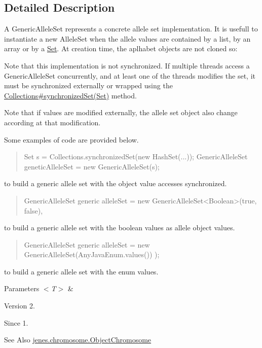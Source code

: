 \subsection{Detailed Description}
A Generic\-Allele\-Set represents a concrete allele set implementation. It is usefull to instantiate a new Allele\-Set when the allele values are contained by a list, by an array or by a \hyperlink{}{Set}. At creation time, the aplhabet objects are not cloned so\-: 

Note that this implementation is not synchronized. If multiple threads access a Generic\-Allele\-Set concurrently, and at least one of the threads modifies the set, it must be synchronized externally or wrapped using the \hyperlink{}{Collections\#synchronized\-Set(\-Set)} method. 

Note that if values are modified externally, the allele set object also change according at that modification. 

Some examples of code are provided below. 

\begin{quotation}

\begin{DoxyPre}
   Set s = Collections.synchronizedSet(new HashSet(...));
   GenericAlleleSet geneticAlleleSet = new GenericAlleleSet(s);
\end{DoxyPre}
\end{quotation}
to build a generic allele set with the object value accesses synchronized. 

\begin{quotation}

\begin{DoxyPre}
   GenericAlleleSet generic alleleSet = new GenericAlleleSet<Boolean>(true, false),
\end{DoxyPre}
\end{quotation}
to build a generic allele set with the boolean values as allele object values. 

\begin{quotation}

\begin{DoxyPre}
   GenericAlleleSet generic alleleSet = new GenericAlleleSet(AnyJavaEnum.values()) );
\end{DoxyPre}
\end{quotation}
to build a generic allele set with the enum values. 


\begin{DoxyParams}{Parameters}
{\em $<$\-T$>$} & \\
\hline
\end{DoxyParams}
\begin{DoxyVersion}{Version}
2. 
\end{DoxyVersion}
\begin{DoxySince}{Since}
1.
\end{DoxySince}
\begin{DoxySeeAlso}{See Also}
\hyperlink{classjenes_1_1chromosome_1_1_object_chromosome}{jenes.\-chromosome.\-Object\-Chromosome} 
\end{DoxySeeAlso}


